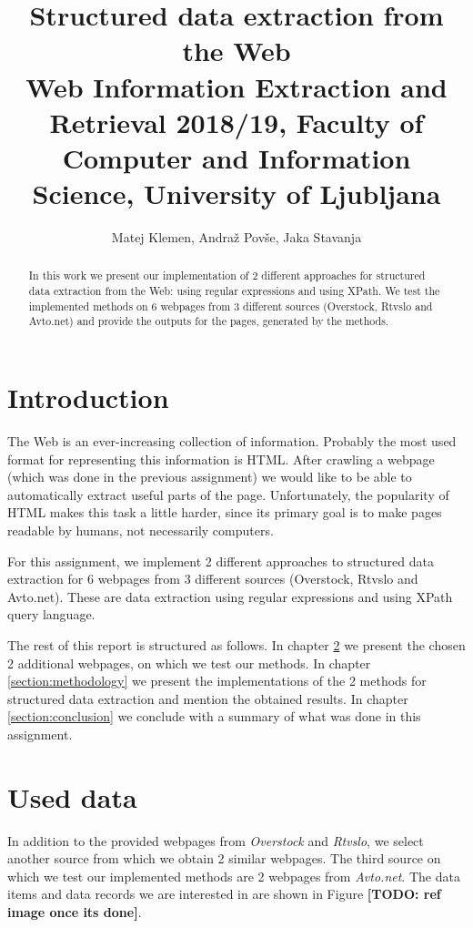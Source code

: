 \documentclass[9pt]{IEEEtran}
\title{\vspace{0ex} %
Structured data extraction from the Web
\\ \normalsize{Web Information Extraction and Retrieval 2018/19, Faculty of Computer and Information Science, University of Ljubljana}}
\author{ %
Matej Klemen, Andraž Povše, Jaka Stavanja
\vspace{-4.0ex}
}
\begin{document}
\maketitle

\begin{abstract}
In this work we present our implementation of 2 different approaches for structured data extraction from the Web: using regular expressions and using XPath.
We test the implemented methods on 6 webpages from 3 different sources (Overstock, Rtvslo and Avto.net) and provide the outputs for the pages, generated by the methods.
\end{abstract}

\section{Introduction}

The Web is an ever-increasing collection of information. 
Probably the most used format for representing this information is HTML.
After crawling a webpage (which was done in the previous assignment) we would like to be able to automatically extract useful parts of the page.
Unfortunately, the popularity of HTML makes this task a little harder, since its primary goal is to make pages readable by humans, not necessarily computers.

For this assignment, we implement 2 different approaches to structured data extraction for 6 webpages from 3 different sources (Overstock, Rtvslo and Avto.net). 
These are data extraction using regular expressions and using XPath query language.

The rest of this report is structured as follows. 
In chapter \ref{section:used-data} we present the chosen 2 additional webpages, on which we test our methods.
In chapter \ref{section:methodology} we present the implementations of the 2 methods for structured data extraction and mention the obtained results.
In chapter \ref{section:conclusion} we conclude with a summary of what was done in this assignment.

\section{Used data}
\label{section:used-data}

In addition to the provided webpages from \textit{Overstock} and \textit{Rtvslo}, we select another source from which we obtain 2 similar webpages.
The third source on which we test our implemented methods are 2 webpages from \textit{Avto.net}. The data items and data records we are interested in are shown in Figure \textbf{[TODO: ref image once its done]}.
\end{document}
